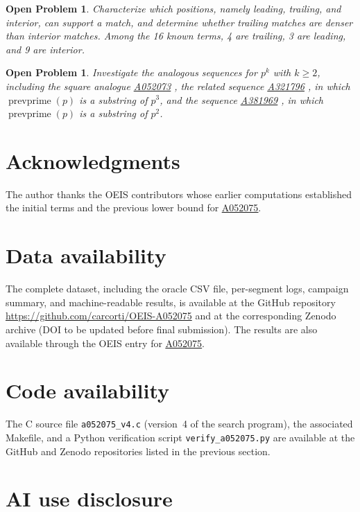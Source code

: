\documentclass[12pt,reqno]{article}
\theoremstyle{plain}
\newtheorem{openproblem}[theorem]{Open Problem}
\theoremstyle{definition}
\theoremstyle{remark}
\newcommand{\prevprime}{\operatorname{prevprime}}
\newcommand{\seqnum}[1]{\href{https://oeis.org/#1}{\rm \underline{#1}}}
\begin{document}
\begin{openproblem}
\label{op:positions}
Characterize which positions, namely leading, trailing, and interior,
can support a match, and determine whether trailing matches are denser
than interior matches.
Among the 16 known terms, 4 are trailing, 3 are leading, and
9 are interior.
\end{openproblem}

\begin{openproblem}
\label{op:analogues}
Investigate the analogous sequences for $p^k$ with $k \geq 2$,
including the square analogue
\seqnum{A052073} \cite{OEIS_A052073},
the related sequence \seqnum{A321796} \cite{OEIS_A321796},
in which $\prevprime(p)$ is a substring of $p^3$,
and the sequence \seqnum{A381969} \cite{OEIS_A381969},
in which $\prevprime(p)$ is a substring of $p^2$.
\end{openproblem}

\section{Acknowledgments}

The author thanks the OEIS contributors whose earlier computations
established the initial terms and the previous lower bound for
\seqnum{A052075}.

\section{Data availability}

The complete dataset, including the oracle CSV file, per-segment logs,
campaign summary, and machine-readable results, is available at
the GitHub repository
\url{https://github.com/carcorti/OEIS-A052075}
and at the corresponding Zenodo archive (DOI to be updated before
final submission).
The results are also available through the OEIS entry
for \seqnum{A052075}.

\section{Code availability}

The C source file \texttt{a052075\_v4.c} (version~4 of the search
program), the associated Makefile, and a Python verification script
\texttt{verify\_a052075.py} are available at the GitHub and Zenodo
repositories listed in the previous section.

\section{AI use disclosure}
\end{document}
